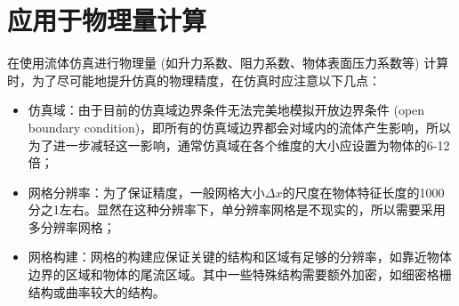 \section{应用于物理量计算}
\label{sec:pp_surface_pressure}
在使用流体仿真进行物理量 (如升力系数、阻力系数、物体表面压力系数等) 计算时，为了尽可能地提升仿真的物理精度，在仿真时应注意以下几点：
\begin{itemize}
    \item 仿真域：由于目前的仿真域边界条件无法完美地模拟开放边界条件 (open boundary condition)，即所有的仿真域边界都会对域内的流体产生影响，所以为了进一步减轻这一影响，通常仿真域在各个维度的大小应设置为物体的6-12倍；
    \item 网格分辨率：为了保证精度，一般网格大小$\Delta x$的尺度在物体特征长度的1000分之1左右。显然在这种分辨率下，单分辨率网格是不现实的，所以需要采用多分辨率网格；
    \item 网格构建：网格的构建应保证关键的结构和区域有足够的分辨率，如靠近物体边界的区域和物体的尾流区域。其中一些特殊结构需要额外加密，如细密格栅结构或曲率较大的结构。
  \end{itemize}

